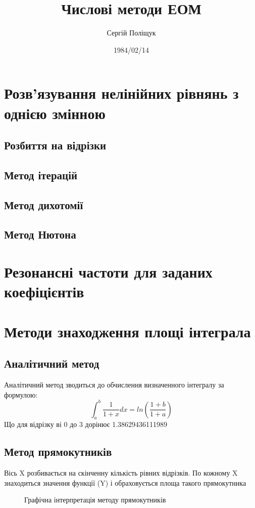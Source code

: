 \documentclass[12pt,a4paper]{article}
\title{Числові методи ЕОМ}
\author{Сергій Поліщук}
\date{1984/02/14}
\begin{document}
\maketitle
\tableofcontents

\clearpage
\section{Розв'язування нелінійних рівнянь з однією змінною}
\subsection{Розбиття на відрізки} \label{subsection}
\subsection{Метод ітерацій} \label{subsection}
\subsection{Метод дихотомії} \label{subsection}
\subsection{Метод Нютона} \label{subsection}

\clearpage
\section{Резонансні частоти для заданих коефіцієнтів}

\clearpage
\section{Методи знаходження площі інтеграла}
\subsection{Аналітичний метод}
Аналітичний метод зводиться до обчислення визначенного інтегралу за формулою:
\begin{equation} \label{eq:1}
\int_{a}^{b}\frac{1}{1+x}dx = ln\left ( \frac{1+b}{1+a} \right )
\end{equation}
Що для відрізку ві 0 до 3 дорінює 1.38629436111989
\subsection{Метод прямокутників} \label{integralRectangle}

Вісь X розбивається на скінченну кількість рівних відрізків. 
По кожному X знаходиться значення функції (Y) і обраховується площа такого прямокутника
\begin{figure}[ht]
    \centering
    \def\svgwidth{\columnwidth}
    \caption{Графічна інтерпретація методу прямокутників}\label{integralRectangleFigure}
    
\end{figure}
\end{document}
